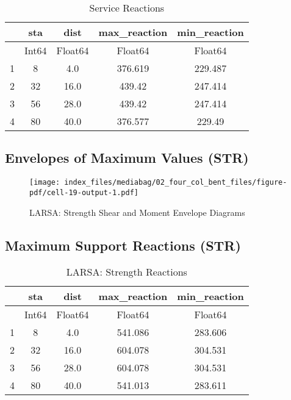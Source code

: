 \documentclass[
  letterpaper,
  DIV=11,
  numbers=noendperiod]{scrreprt}
\begin{document}
\begin{table}
\caption{Service Reactions}\tabularnewline

\centering
\begin{tabular}{r|cccc}
    & sta & dist & max\_reaction & min\_reaction\\
    \hline
    & Int64 & Float64 & Float64 & Float64\\
    \hline
    1 & 8 & 4.0 & 376.619 & 229.487 \\
    2 & 32 & 16.0 & 439.42 & 247.414 \\
    3 & 56 & 28.0 & 439.42 & 247.414 \\
    4 & 80 & 40.0 & 376.577 & 229.49 \\
\end{tabular}
\end{table}

\subsection{Envelopes of Maximum Values
(STR)}\label{envelopes-of-maximum-values-str-1}

\begin{figure}[H]

{\centering \texttt{[image: index\_files/mediabag/02\_four\_col\_bent\_files/figure-pdf/cell-19-output-1.pdf]}

}

\caption{LARSA: Strength Shear and Moment Envelope Diagrams}

\end{figure}%

\subsection{Maximum Support Reactions
(STR)}\label{maximum-support-reactions-str-1}

\begin{table}
\caption{LARSA: Strength Reactions}\tabularnewline

\centering
\begin{tabular}{r|cccc}
    & sta & dist & max\_reaction & min\_reaction\\
    \hline
    & Int64 & Float64 & Float64 & Float64\\
    \hline
    1 & 8 & 4.0 & 541.086 & 283.606 \\
    2 & 32 & 16.0 & 604.078 & 304.531 \\
    3 & 56 & 28.0 & 604.078 & 304.531 \\
    4 & 80 & 40.0 & 541.013 & 283.611 \\
\end{tabular}
\end{table}
\end{document}
